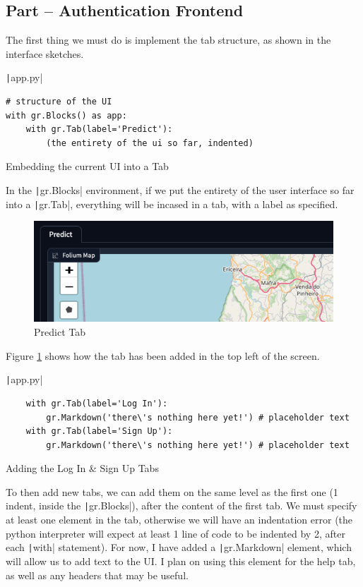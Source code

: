 \documentclass[12pt]{report}
\newcommand{\pil}[1]{\protect\texttt|#1|}
\begin{document}
\subsection{Part \theparts{} -- Authentication Frontend}

The first thing we must do is implement the tab structure, as shown in the interface sketches.

\begin{listing}[H]
\pil{app.py}
\begin{verbatim}
# structure of the UI
with gr.Blocks() as app:
    with gr.Tab(label='Predict'):
        (the entirety of the ui so far, indented)
\end{verbatim}
\caption{Embedding the current UI into a Tab}\label{cs:addingTabs}
\end{listing}

In the \pil{gr.Blocks} environment, if we put the entirety of the user interface so far into a \pil{gr.Tab}, everything will be incased in a tab, with a label as specified.

\begin{figure}[H]
\centering
\includegraphics[width=12cm]{ss14.1.png}
\caption{Predict Tab}\label{fig:ss14.1}
\end{figure}

Figure \ref{fig:ss14.1} shows how the tab has been added in the top left of the screen.

\begin{listing}[H]
\pil{app.py}
\begin{verbatim}
    with gr.Tab(label='Log In'):
        gr.Markdown('there\'s nothing here yet!') # placeholder text
    with gr.Tab(label='Sign Up'):
        gr.Markdown('there\'s nothing here yet!') # placeholder text
\end{verbatim}
\caption{Adding the Log In \& Sign Up Tabs}\label{cs:logInSignUpTabs}
\end{listing}

To then add new tabs, we can add them on the same level as the first one (1 indent, inside the \pil{gr.Blocks}), after the content of the first tab. We must specify at least one element in the tab, otherwise we will have an indentation error (the python interpreter will expect at least 1 line of code to be indented by 2, after each \pil{with} statement). For now, I have added a \pil{gr.Markdown} element, which will allow us to add text to the UI. I plan on using this element for the help tab, as well as any headers that may be useful.
\end{document}
